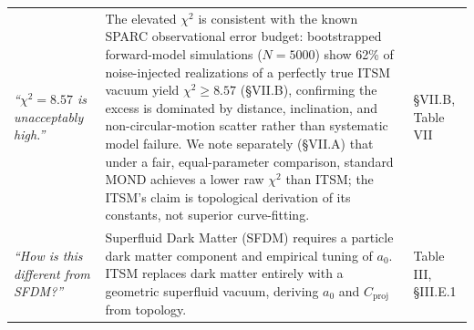 \documentclass[aps,prd,10pt,twocolumn,superscriptaddress,nofootinbib,floatfix]{revtex4-2}
\begin{document}
\begin{table}[htbp]
\begin{tabular}{p{} p{} p{}}
\textit{``$\chi^2 = 8.57$ is unacceptably high.''} & The elevated $\chi^2$ is consistent with the known SPARC observational error budget: bootstrapped forward-model simulations ($N=5000$) show 62\% of noise-injected realizations of a perfectly true ITSM vacuum yield $\chi^2 \geq 8.57$ (\S VII.B), confirming the excess is dominated by distance, inclination, and non-circular-motion scatter rather than systematic model failure. We note separately (\S VII.A) that under a fair, equal-parameter comparison, standard MOND achieves a lower raw $\chi^2$ than ITSM; the ITSM's claim is topological derivation of its constants, not superior curve-fitting. & \S VII.B, Table VII \\
\textit{``How is this different from SFDM?''} & Superfluid Dark Matter (SFDM) requires a particle dark matter component \cite{sf_dm} and empirical tuning of $a_0$. ITSM replaces dark matter entirely with a geometric superfluid vacuum, deriving $a_0$ and $C_{\text{proj}}$ from topology. & Table III, \S III.E.1 \\
\bottomrule
\end{tabular}
\end{table}


\clearpage


\end{document}
